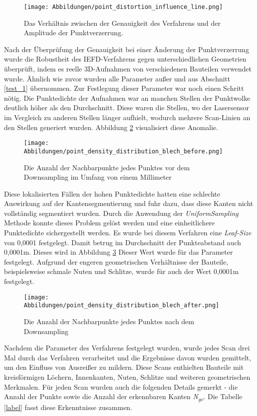 \begin{figure}[h]
	\texttt{[image: Abbildungen/point\_distortion\_influence\_line.png]}
	\centering
	\caption{Das Verhältnis zwischen der Genauigkeit des Verfahrens und der Amplitude der Punktverzerrung.}
	\label{fig: point_distortion_comparision}
\end{figure}

Nach der Überprüfung der Genauigkeit bei einer Änderung der Punktverzerrung wurde die Robustheit des IEFD-Verfahrens gegen unterschiedlichen Geometrien überprüft, indem es reelle 3D-Aufnahmen von verschiedenen Bauteilen verwendet wurde. Ähnlich wie zuvor wurden alle Parameter außer \distthresha und \distthreshb aus Abschnitt \ref{test_1} übernommen. Zur Festlegung dieser Parameter war noch einen Schritt nötig. Die Punktedichte der Aufnahmen war an manchen Stellen der Punktwolke deutlich höher als den Durchschnitt. Diese waren die Stellen, wo der Lasersensor im Vergleich zu anderen Stellen länger aufhielt, wodurch mehrere Scan-Linien an den Stellen generiert wurden. Abbildung \ref{fig: point_density_before} visualisiert diese Anomalie. 

\begin{figure}[t]
\texttt{[image: Abbildungen/point\_density\_distribution\_blech\_before.png]}
\centering
\caption{Die Anzahl der Nachbarpunkte jedes Punktes vor dem Downsampling im Umfang von einem Millimeter}
\label{fig: point_density_before}
\end{figure}

Diese lokalisierten Fällen der hohen Punktedichte hatten eine schlechte Auswirkung auf der Kantensegmentierung und fuhr dazu, dass diese Kanten nicht vollständig segmentiert wurden. Durch die Anwendung der \textit{UniformSampling} Methode konnte dieses Problem gelöst werden und eine einheitlichere Punktedichte sichergestellt werden. Es wurde bei diesem Verfahren eine \textit{Leaf-Size} von 0,0001 festgelegt. Damit betrug im Durchschnitt der Punkteabstand auch 0,0001m. Dieses wird in Abbildung \ref{fig: point_density_after} Dieser Wert wurde für das Parameter \distthresha festgelegt. Aufgrund der engeren geometrischen Verhältnisse der Bauteile, beispielsweise schmale Nuten und Schlitze, wurde für \distthreshb auch der Wert 0,0001m festgelegt.

\begin{figure}[t]
	\texttt{[image: Abbildungen/point\_density\_distribution\_blech\_after.png]}
	\centering
	\caption{Die Anzahl der Nachbarpunkte jedes Punktes nach dem Downsampling}
	\label{fig: point_density_after}
\end{figure}

Nachdem die Parameter des Verfahrens festgelegt wurden, wurde jedes Scan drei Mal durch das Verfahren verarbeitet und die Ergebnisse davon wurden gemittelt, um den Einfluss von Ausreißer zu mildern. Diese Scans enthielten Bauteile mit kreisförmigen Löchern, Innenkanten, Nuten, Schlitze und weiteren geometrischen Merkmalen. Für jeden Scan wurden auch die folgenden Details gemerkt - die Anzahl der Punkte sowie die Anzahl der erkennbaren Kanten \textit{N\textsubscript{gc}}. Die Tabelle \ref{label} fasst diese Erkenntnisse zusammen.